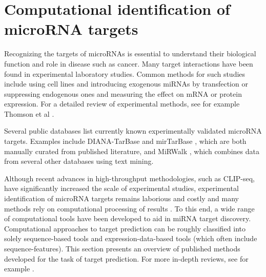 
\section{Computational identification of microRNA targets}




Recognizing the targets of microRNAs is essential to understand their
biological function and role in disease such as cancer. Many target
interactions have been found in experimental laboratory studies. Common
methods for such studies include using cell lines and introducing exogenous
miRNAs by transfection or suppressing endogenous ones and measuring the
effect on mRNA or protein expression. For a detailed review of experimental
methods, see for example Thomson et al \citep{Thomson2011}.

Several public databases list currently known experimentally validated
microRNA targets. Examples include DIANA-TarBase \citep{Vlachos2015} and
mirTarBase \citep{Chou2016}, which are both manually curated from published
literature, and MiRWalk \citep{Dweep2015}, which combines data from several
other databases using text mining.

Although recent advances in high-throughput methodologies, such as CLIP-seq,
have significantly increased the scale of experimental studies, experimental
identification of microRNA targets remains laborious and costly and many
methods rely on computational processing of results \citep{Vlachos2015}. To
this end, a wide range of computational tools have been developed to aid in
miRNA target discovery. Computational approaches to target prediction
can be roughly classified into solely sequence-based tools and
expression-data-based tools (which often include sequence-features).
This section presents an overview of published methods developed for the
task of target prediction.
For more in-depth reviews, see for example \citep{Yue2009,Muniategui2013}.




